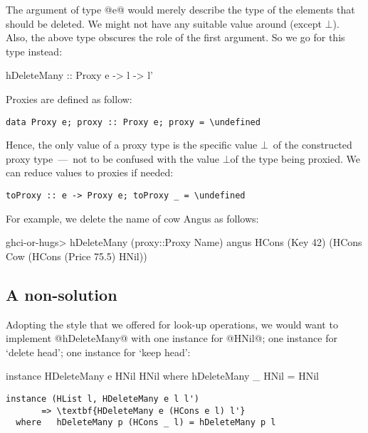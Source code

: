 \documentclass[nocopyrightspace,preprint]{sigplan-proc}
\newcommand{\undefined}{\ensuremath{\bot}}
\begin{document}
The argument of type @e@ would merely describe the type of the
elements that should be deleted. We might not have any suitable value
around (except \undefined). Also, the above type obscures the role of
the first argument. So we go for this type instead:

\begin{code}
 hDeleteMany :: Proxy e -> l -> l'
\end{code}

Proxies are defined as follow:

\begin{Verbatim}[commandchars=\\\{\}]
 data Proxy e; proxy :: Proxy e; proxy = \undefined
\end{Verbatim}

Hence, the only value of a proxy type is the specific value
\undefined\ of the constructed proxy type~---~not to be confused with
the value \undefined of the type being proxied. We can reduce values
to proxies if needed:

\begin{Verbatim}[commandchars=\\\{\}]
 toProxy :: e -> Proxy e; toProxy _ = \undefined
\end{Verbatim}

For example, we delete the name of cow Angus as follows:

\begin{code}
 ghci-or-hugs> hDeleteMany (proxy::Proxy Name) angus
 HCons (Key 42) (HCons Cow (HCons (Price 75.5) HNil))
\end{code}


\medskip

\subsection*{A non-solution}

Adopting the style that we offered for look-up operations, we would
want to implement @hDeleteMany@ with one instance for @HNil@; one
instance for `delete head'; one instance for `keep head':

\begin{code}
 instance HDeleteMany e HNil HNil
   where  hDeleteMany _ HNil = HNil
\end{code}

\begin{Verbatim}[commandchars=\\\{\}]
 instance (HList l, HDeleteMany e l l')
       => \textbf{HDeleteMany e (HCons e l) l'}
  where   hDeleteMany p (HCons _ l) = hDeleteMany p l
\end{Verbatim}
\end{document}
